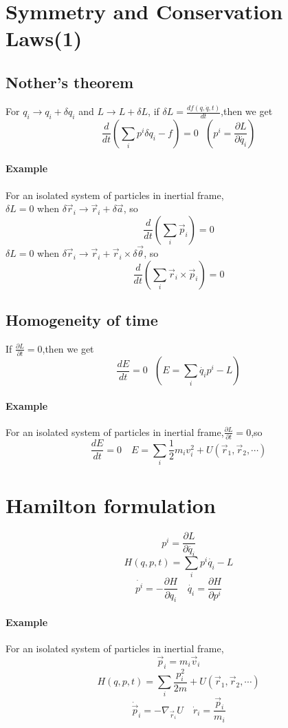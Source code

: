 \documentclass{article}
\begin{document}
\section{Symmetry and Conservation Laws(1)}
\subsection{Nother's theorem}
For $q_i \to q_i+\delta q_i$ and $L \to L+\delta L$, if $\delta L= \frac{d f(q,\dot{q},t)}{dt}$,then we get
\[\frac{d}{dt}(\sum_i p^i \delta q_i-f)=0 \ \ \ (p^i=\frac{\partial L}{\partial \dot{q_i}})\]
\paragraph{Example} For an isolated system of particles in inertial frame,\\ 
$\delta L = 0$ when $\delta \vec{r}_i \rightarrow \vec{r}_i + \delta \vec{a}$, so
\[\frac{d}{dt} (\sum_i \vec{p}_i) = 0\]
$\delta L = 0$ when $\delta \vec{r}_i \rightarrow \vec{r}_i + \vec{r}_i \times \delta \vec{\theta}$, so
\[\frac{d}{dt} (\sum_i \vec{r}_i \times \vec{p}_i) = 0\]

\subsection{Homogeneity of time}
If $\frac{\partial L}{\partial t}=0$,then we get
\[\frac{dE}{dt}=0 \ \ \ (E=\sum_i \dot{q_i}p^i-L)\]
\paragraph{Example} For an isolated system of particles in inertial frame,$\frac{\partial L}{\partial t} = 0$,so
\[\frac{dE}{dt} = 0 \quad E = \sum_i \frac{1}{2} m_i v_i^2 + U(\vec{r}_1,\vec{r}_2,\cdots)\]


\section{Hamilton formulation}
\[p^i = \frac{\partial L}{\partial \dot{q_i}}\]
\[H(q,p,t)=\sum_i p^i \dot{q_i}-L\]
\[\dot{p^i}=-\frac{\partial H}{\partial q_i} \quad \dot{q_i}=\frac{\partial H}{\partial p^i}\]
\paragraph{Example} For an isolated system of particles in inertial frame, 
\[\vec{p}_i = m_i \vec{v}_i\]
\[H(q,p,t)=\sum_i \frac{p_i^2}{2m} + U(\vec{r}_1,\vec{r}_2,\cdots)\]
\[\dot{\vec{p}}_i =-\nabla_{\vec{r}_i} U \quad \dot{r}_i = \frac{\vec{p}_i}{m_i}\]
 
\end{document}
